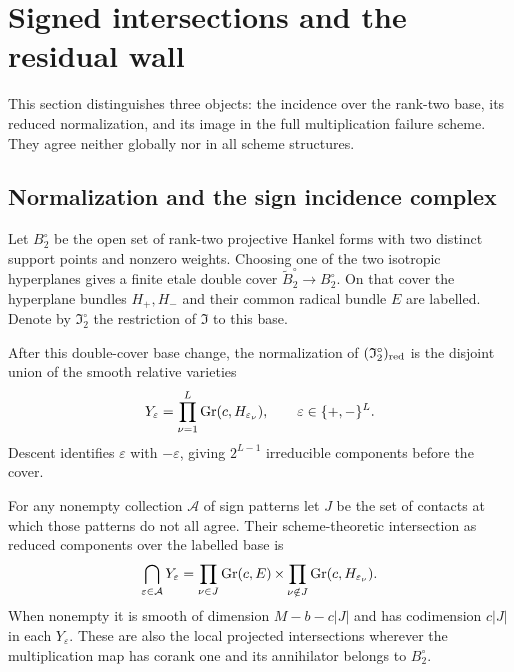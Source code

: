 \section{Signed intersections and the residual wall}\label{sec:wall-geometry}
This section distinguishes three objects: the incidence over the
rank-two base, its reduced normalization, and its image in the full
multiplication failure scheme. They agree neither globally nor in all
scheme structures.

\subsection{Normalization and the sign incidence complex}
Let $B_2^\circ$ be the open set of rank-two projective Hankel forms with
two distinct support points and nonzero weights. Choosing one of the
two isotropic hyperplanes gives a finite etale double cover
$\widetilde B_2^\circ\longrightarrow B_2^\circ$. On that cover the
hyperplane bundles $H_+,H_-$ and their common radical bundle $E$ are
labelled. Denote by $\mathfrak I_2^\circ$ the restriction of
$\mathfrak I$ to this base.
\begin{theorem}
\label{thm:signed-normalization}
After this double-cover base change, the normalization of
$(\mathfrak I_2^\circ)_{\rm red}$ is the disjoint union of the smooth
relative varieties
\[
 Y_\varepsilon=\prod_{\nu=1}^L\operatorname{Gr}(c,H_{\varepsilon_\nu}),
 \qquad\varepsilon\in\{+,-\}^L.
\]
Descent identifies $\varepsilon$ with $-\varepsilon$, giving
$2^{L-1}$ irreducible components before the cover.

For any nonempty collection $\mathcal A$ of sign patterns let $J$ be
the set of contacts at which those patterns do not all agree. Their
scheme-theoretic intersection as reduced components over the labelled
base is
\begin{equation}\label{eq:sign-intersections}
 \bigcap_{\varepsilon\in\mathcal A}Y_\varepsilon
 =\prod_{\nu\in J}\operatorname{Gr}(c,E)
  \mathop{\times}\prod_{\nu\notin J}\operatorname{Gr}(c,H_{\varepsilon_\nu}).
\end{equation}
When nonempty it is smooth of dimension $M-b-c|J|$ and has
codimension $c|J|$ in each $Y_\varepsilon$.
These are also the local projected intersections wherever the
multiplication map has corank one and its annihilator belongs to
$B_2^\circ$.
\end{theorem}
